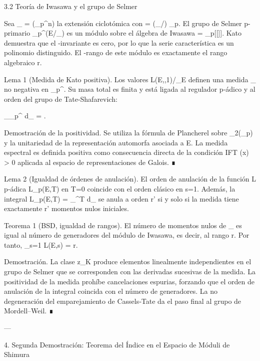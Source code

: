 \documentclass[12pt,twoside]{book}
\begin{document}
3.2 Teoría de Iwasawa y el grupo de Selmer

Sea _{\infty} = \bigcup {}(\mu_{p^n}) la extensión ciclotómica con \Gamma = (_{\infty}/) \cong {}_p. El grupo de Selmer p-primario _{p^\infty}(E/_{\infty}) es un módulo sobre el álgebra de Iwasawa \Lambda = _p[[\Gamma]]. Kato demuestra que el \mu-invariante es cero, por lo que la serie característica es un polinomio distinguido. El \Lambda-rango de este módulo es exactamente el rango algebraico r.

Lema 1 (Medida de Kato positiva). Los valores L(E,\chi,1)/\Omega_E definen una medida \mu_{} no negativa en _p^\times. Su masa total es finita y está ligada al regulador p‑ádico y al orden del grupo de Tate‑Shafarevich:

\int_{_p^\times} d\mu_{} = .

Demostración de la positividad. Se utiliza la fórmula de Plancherel sobre _2(_p) y la unitariedad de la representación automorfa asociada a E. La medida espectral es definida positiva como consecuencia directa de la condición IFT \rho(x) > 0 aplicada al espacio de representaciones de Galois. ∎

Lema 2 (Igualdad de órdenes de anulación). El orden de anulación de la función L p‑ádica L_p(E,T) en T=0 coincide con el orden clásico en s=1. Además, la integral L_p(E,T) = \int \chi_{}^T d\mu_{} se anula a orden r' si y solo si la medida tiene exactamente r' momentos nulos iniciales.

Teorema 1 (BSD, igualdad de rangos). El número de momentos nulos de \mu_{} es igual al número de generadores del módulo de Iwasawa, es decir, al rango r. Por tanto, _{s=1} L(E,s) = r.

Demostración. La clase z_K produce elementos linealmente independientes en el grupo de Selmer que se corresponden con las derivadas sucesivas de la medida. La positividad de la medida prohíbe cancelaciones espurias, forzando que el orden de anulación de la integral coincida con el número de generadores. La no degeneración del emparejamiento de Cassels‑Tate da el paso final al grupo de Mordell–Weil. ∎

---

4. Segunda Demostración: Teorema del Índice en el Espacio de Móduli de Shimura
\end{document}
